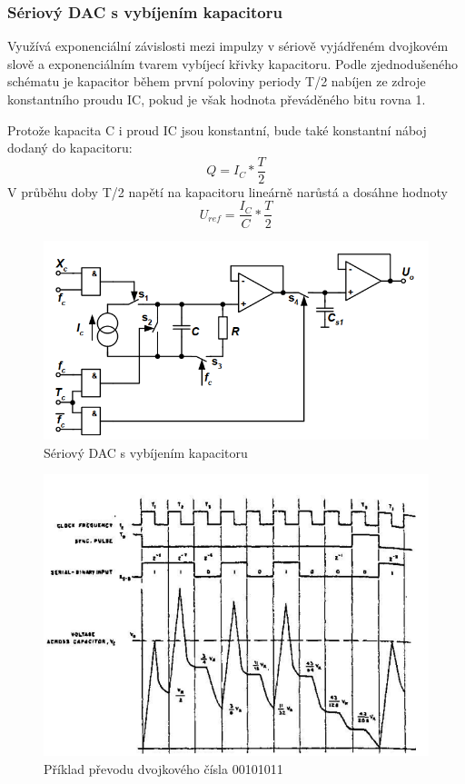 \subsubsection{Sériový DAC s vybíjením kapacitoru}
Využívá exponenciální závislosti mezi impulzy v sériově vyjádřeném dvojkovém slově a exponenciálním tvarem vybíjecí křivky kapacitoru. Podle zjednodušeného schématu je kapacitor během první poloviny periody T/2 nabíjen ze zdroje konstantního proudu IC, pokud je však hodnota převáděného bitu rovna 1.

Protože kapacita C i proud IC jsou konstantní, bude také konstantní náboj dodaný do kapacitoru:
\begin{equation}
Q=I_{C}*\frac{T}{2}
\end{equation}
V průběhu doby T/2 napětí na kapacitoru lineárně narůstá a dosáhne hodnoty
\begin{equation}
U_{ref}=\frac{I_{C}}{C}*\frac{T}{2}
\end{equation}

\begin{figure}[h]
   \begin{center}
     \includegraphics[scale=0.6]{images/DACC.png}
   \end{center}
   \caption{Sériový DAC s vybíjením kapacitoru}
\end{figure}

\begin{figure}[h]
   \begin{center}
     \includegraphics[scale=0.6]{images/DAgraf.png}
   \end{center}
   \caption{Příklad převodu dvojkového čísla 00101011}
\end{figure}
\newpage
